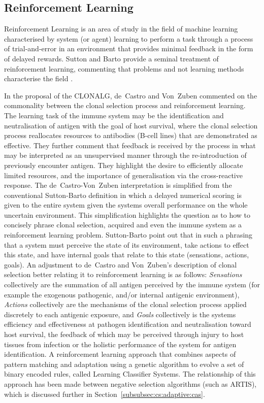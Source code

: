 %
%
\subsection{Reinforcement Learning}
\label{subsec:cs:related:rl}
Reinforcement Learning is an area of study in the field of machine learning characterised by system (or agent) learning to perform a task through a process of trial-and-error in an environment that provides minimal feedback in the form of delayed rewards. Sutton and Barto provide a seminal treatment of reinforcement learning, commenting that problems and not learning methods characterise the field \cite{Sutton1998}.

In the proposal of the CLONALG, de~Castro and Von~Zuben commented on the commonality between the clonal selection process and reinforcement learning. The learning task of the immune system may be the identification and neutralisation of antigen with the goal of host survival, where the clonal selection process reallocates resources to antibodies (B-cell lines) that are demonstrated as effective. They further comment that feedback is received by the process in what may be interpreted as an unsupervised manner through the re-introduction of previously encounter antigen. They highlight the desire to efficiently allocate limited resources, and the importance of generalisation via the cross-reactive response. The de~Castro-Von~Zuben interpretation is simplified from the conventional Sutton-Barto definition in which a delayed numerical scoring is given to the entire system given the systems overall performance on the whole uncertain environment. This simplification highlights the question as to how to concisely phrase clonal selection, acquired and even the immune system as a reinforcement learning problem. Sutton-Barto point out that in such a phrasing that a system must perceive the state of its environment, take actions to effect this state, and have internal goals that relate to this state (sensations, actions, goals). 
An adjustment to de~Castro and Von~Zuben's description of clonal selection better relating it to reinforcement learning is as follows: \emph{Sensations} collectively are the summation of all antigen perceived by the immune system (for example the exogenous pathogenic, and/or internal antigenic environment), \emph{Actions} collectively are the mechanisms of the clonal selection process applied discretely to each antigenic exposure, and \emph{Goals} collectively is the systems efficiency and effectiveness at pathogen identification and neutralisation toward host survival, the feedback of which may be perceived through injury to host tissues from infection or the holistic performance of the system for antigen identification. A reinforcement learning approach that combines aspects of pattern matching and adaptation using a genetic algorithm to evolve a set of binary encoded rules, called Learning Classifier Systems. The relationship of this approach has been made between negative selection algorithms (such as ARTIS), which is discussed further in Section~\ref{subsubsec:cs:adaptive:cas}.


